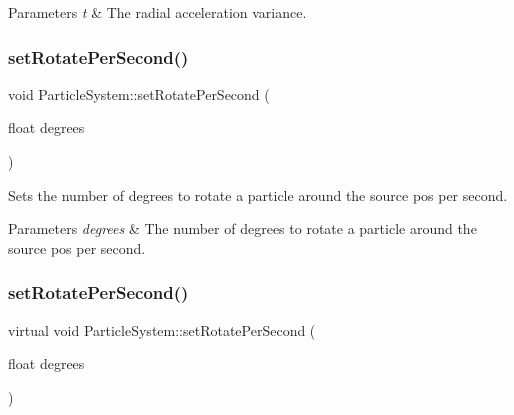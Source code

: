 \begin{DoxyParams}{Parameters}
{\em t} & The radial acceleration variance. \\
\hline
\end{DoxyParams}
\mbox{\label{classParticleSystem_aaca0a95f3742395cb1826d1f6896432d}} 
\subsubsection{\texorpdfstring{set\+Rotate\+Per\+Second()}{setRotatePerSecond()}\hspace{0.1cm}{\footnotesize\ttfamily [1/2]}}
{\footnotesize\ttfamily void Particle\+System\+::set\+Rotate\+Per\+Second (\begin{DoxyParamCaption}\item[{float}]{degrees }\end{DoxyParamCaption})\hspace{0.3cm}{\ttfamily [virtual]}}

Sets the number of degrees to rotate a particle around the source pos per second.


\begin{DoxyParams}{Parameters}
{\em degrees} & The number of degrees to rotate a particle around the source pos per second. \\
\hline
\end{DoxyParams}
\mbox{\label{classParticleSystem_ae55fdc52e868e9b4ed14ec02b1004906}} 
\subsubsection{\texorpdfstring{set\+Rotate\+Per\+Second()}{setRotatePerSecond()}\hspace{0.1cm}{\footnotesize\ttfamily [2/2]}}
{\footnotesize\ttfamily virtual void Particle\+System\+::set\+Rotate\+Per\+Second (\begin{DoxyParamCaption}\item[{float}]{degrees }\end{DoxyParamCaption})\hspace{0.3cm}{\ttfamily [virtual]}}

